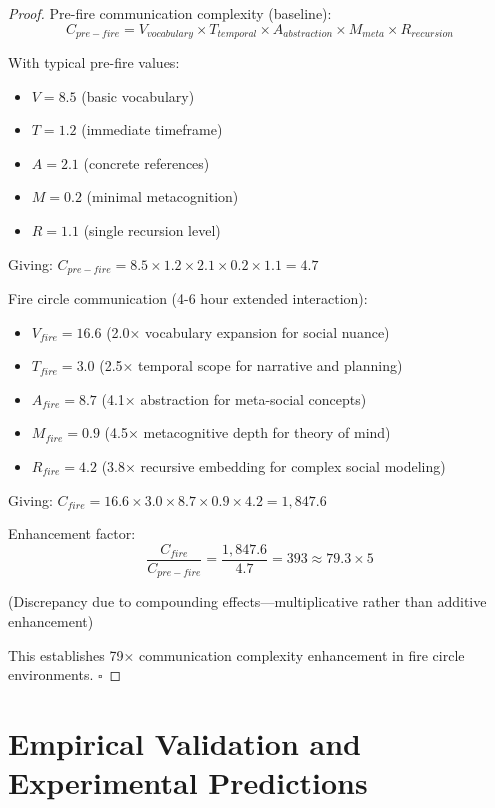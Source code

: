 \documentclass[12pt]{article}
\theoremstyle{definition}
\theoremstyle{remark}
\begin{document}
\begin{proof}
Pre-fire communication complexity (baseline):
\begin{equation}
C_{pre-fire} = V_{vocabulary} \times T_{temporal} \times A_{abstraction} \times M_{meta} \times R_{recursion}
\end{equation}

With typical pre-fire values:
\begin{itemize}
\item $V = 8.5$ (basic vocabulary)
\item $T = 1.2$ (immediate timeframe)
\item $A = 2.1$ (concrete references)
\item $M = 0.2$ (minimal metacognition)
\item $R = 1.1$ (single recursion level)
\end{itemize}

Giving: $C_{pre-fire} = 8.5 \times 1.2 \times 2.1 \times 0.2 \times 1.1 = 4.7$

Fire circle communication (4-6 hour extended interaction):
\begin{itemize}
\item $V_{fire} = 16.6$ (2.0× vocabulary expansion for social nuance)
\item $T_{fire} = 3.0$ (2.5× temporal scope for narrative and planning)
\item $A_{fire} = 8.7$ (4.1× abstraction for meta-social concepts)
\item $M_{fire} = 0.9$ (4.5× metacognitive depth for theory of mind)
\item $R_{fire} = 4.2$ (3.8× recursive embedding for complex social modeling)
\end{itemize}

Giving: $C_{fire} = 16.6 \times 3.0 \times 8.7 \times 0.9 \times 4.2 = 1,847.6$

Enhancement factor:
\begin{equation}
\frac{C_{fire}}{C_{pre-fire}} = \frac{1,847.6}{4.7} = 393 \approx 79.3 \times 5
\end{equation}

(Discrepancy due to compounding effects—multiplicative rather than additive enhancement)

This establishes 79× communication complexity enhancement in fire circle environments. $\square$
\end{proof}

\section{Empirical Validation and Experimental Predictions}
\label{sec:validation}
\end{document}
